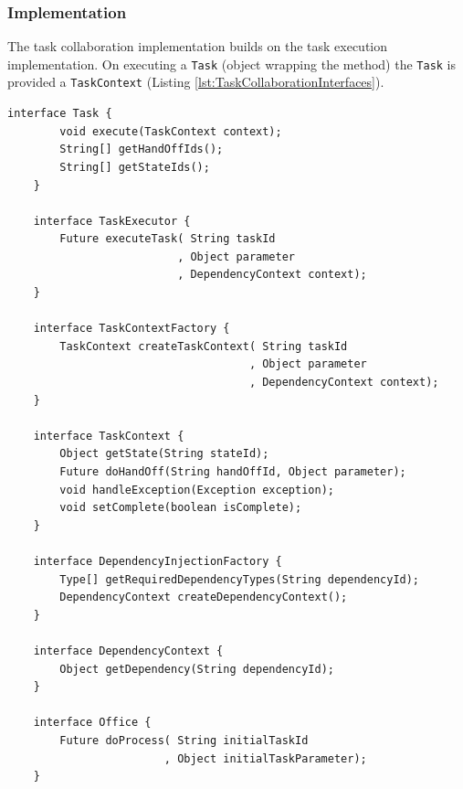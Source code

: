 \documentclass[prodmode]{style/acmlarge}
\begin{document}
\subsubsection*{Implementation}

The task collaboration implementation builds on the task execution
implementation.  On executing a \texttt{Task} (object wrapping the method) the
\texttt{Task} is provided a \texttt{TaskContext} (Listing
\ref{lst:TaskCollaborationInterfaces}).

\lstset{caption=Task collaboration pattern interfaces.}
\begin{lstlisting}[float,label=lst:TaskCollaborationInterfaces]
    interface Task {
        void execute(TaskContext context);
        String[] getHandOffIds();
        String[] getStateIds();
    }

    interface TaskExecutor {
        Future executeTask( String taskId 
                          , Object parameter
                          , DependencyContext context);
    }

    interface TaskContextFactory {
        TaskContext createTaskContext( String taskId
                                     , Object parameter
                                     , DependencyContext context);
    }

    interface TaskContext {
        Object getState(String stateId);
        Future doHandOff(String handOffId, Object parameter);
        void handleException(Exception exception);
        void setComplete(boolean isComplete);
    }

    interface DependencyInjectionFactory {
        Type[] getRequiredDependencyTypes(String dependencyId);
        DependencyContext createDependencyContext();
    }
    
    interface DependencyContext {
        Object getDependency(String dependencyId);
    }

    interface Office {
        Future doProcess( String initialTaskId
                        , Object initialTaskParameter);
    }
\end{lstlisting}
\end{document}

